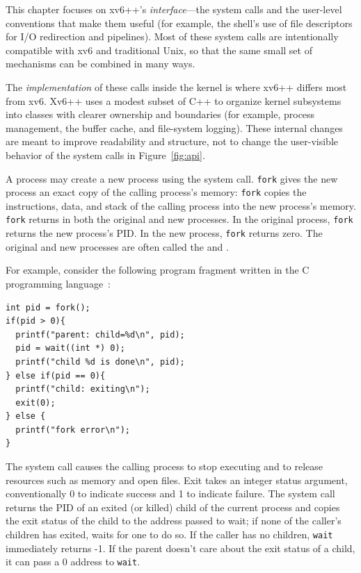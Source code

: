 This chapter focuses on xv6++'s \emph{interface}---the system calls and the
user-level conventions that make them useful (for example, the shell's use of
file descriptors for I/O redirection and pipelines).
Most of these system calls are intentionally compatible with xv6 and traditional
Unix, so that the same small set of mechanisms can be combined in many ways.

The \emph{implementation} of these calls inside the kernel is where xv6++ differs
most from xv6.  Xv6++ uses a modest subset of C++ to organize kernel subsystems
into classes with clearer ownership and boundaries (for example, process
management, the buffer cache, and file-system logging).
These internal changes are meant to improve readability and structure, not to
change the user-visible behavior of the system calls in Figure~\ref{fig:api}.

A process may create a new process using the
system call.
\lstinline{fork}
gives the new process an exact copy of the calling
process's memory: \lstinline{fork} copies the instructions, data, and
stack of the calling process into the new process's memory.
\lstinline{fork}
returns in both the original and new processes.
In the original process, \lstinline{fork} returns the new process's
PID.
In the new process, \lstinline{fork} returns zero.
The original and new processes are often called the
and
.

For example, consider the following program fragment written in the C
programming language~\cite{kernighan}:
\begin{lstlisting}[]
int pid = fork();
if(pid > 0){
  printf("parent: child=%d\n", pid);
  pid = wait((int *) 0);
  printf("child %d is done\n", pid);
} else if(pid == 0){
  printf("child: exiting\n");
  exit(0);
} else {
  printf("fork error\n");
}
\end{lstlisting}
The
system call causes the calling process to stop executing and
to release resources such as memory and open files.
Exit takes an integer status argument,
conventionally 0 to indicate success and 1 to indicate failure.
The
system call returns the PID of an exited (or killed) child of the
current process and copies the exit status of the child to the address
passed to wait; if none of the caller's children
has exited,
waits for one to do so.
If the caller has no children, \lstinline{wait} immediately
returns -1.
If the parent doesn't care about the exit status of a child, it can
pass a 0 address to
\lstinline{wait}.

